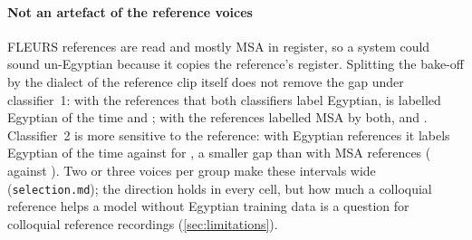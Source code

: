 \paragraph{Not an artefact of the reference voices}
FLEURS references are read and mostly MSA in register, so a system could sound un-Egyptian because it copies the
reference's register. Splitting the bake-off by the dialect of the reference clip itself does not remove the gap under
classifier~1: with the  references that both classifiers label Egyptian, \cbthree is labelled
Egyptian  of the time and \vox {}; with the  references
labelled MSA by both,  and . Classifier~2 is more sensitive to the reference:
with Egyptian references it labels \cbthree Egyptian  of the time against 
for \vox, a smaller gap than with MSA references ( against ). Two or three
voices per group make these intervals wide (\texttt{selection.md}); the direction holds in every cell, but how much a
colloquial reference helps a model without Egyptian training data is a question for colloquial reference recordings
(\cref{sec:limitations}).

